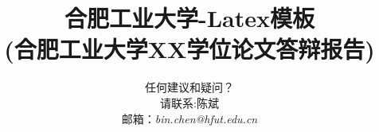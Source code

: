 \documentclass[12pt,aspectratio=169]{beamer} %
\title{
合肥工业大学-Latex模板\\
{\small{(合肥工业大学XX学位论文答辩报告)}}
}%
\author{{\footnotesize 任何建议和疑问？  \texorpdfstring{\\请联系:陈斌 \\ 邮箱：\textit{bin.chen@hfut.edu.cn}}{}}}
\institute{{\footnotesize 某某组/实验室,\\ 计算机与信息学院,\\ 合肥工业大学,中国\\ \url{www.hfut.edu.cn}}}
\begin{document}
\graphicspath{{figures/}}





  
  

  
\end{document}
